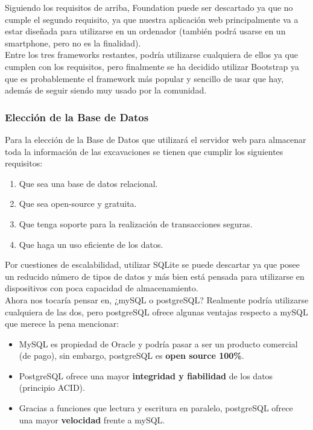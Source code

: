     Siguiendo los requisitos de arriba, Foundation puede ser descartado ya que no cumple el
    segundo requisito, ya que nuestra aplicación web principalmente va a estar diseñada para
    utilizarse en un ordenador (también podrá usarse en un smartphone, pero no es la
    finalidad).\\

    Entre los tres frameworks restantes, podría utilizarse cualquiera de ellos ya que
    cumplen con los requisitos, pero finalmente se ha decidido utilizar Bootstrap ya que
    es probablemente el framework más popular y sencillo de usar que hay, además de seguir
    siendo muy usado por la comunidad. 
    

    \subsubsection{Elección de la Base de Datos}
    Para la elección de la Base de Datos que utilizará el servidor web para almacenar toda
    la información de las excavaciones se tienen que cumplir los siguientes requisitos:

        \begin{enumerate}
            \item Que sea una base de datos relacional.
            \item Que sea open-source y gratuita.
            \item Que tenga soporte para la realización de transacciones seguras.
            \item Que haga un uso eficiente de los datos.
        \end{enumerate}

    Por cuestiones de escalabilidad, utilizar SQLite se puede descartar ya que posee un
    reducido número de tipos de datos y más bien está pensada para utilizarse en dispositivos
    con poca capacidad de almacenamiento.\\

    Ahora nos tocaría pensar en, ¿mySQL o postgreSQL? Realmente podría utilizarse cualquiera
    de las dos, pero postgreSQL ofrece algunas ventajas respecto a mySQL que merece la pena
    mencionar: 
    
        \begin{itemize}
            \item MySQL es propiedad de Oracle y podría pasar a ser un producto comercial
            (de pago), sin embargo, postgreSQL es \textbf{open source 100\%}.
            \item PostgreSQL ofrece una mayor \textbf{integridad y fiabilidad} de los datos
            (principio ACID).
            \item Gracias a funciones que lectura y escritura en paralelo, postgreSQL ofrece
            una mayor \textbf{velocidad} frente a mySQL.
        \end{itemize}
    
